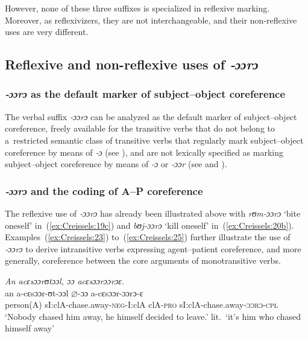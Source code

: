 \documentclass[output=paper]{langscibook}
\begin{document}
  \z
\z

However, none of these three suffixes is specialized in reflexive marking.
Moreover, as reflexivizers, they are not interchangeable, and their
non-reflexive uses are very different.

\subsection{Reflexive and non-reflexive uses of \textit{‑ɔɔrɔ}}%
\label{sec:Creissels:ooro}

\subsubsection{\textit{‑ɔɔrɔ} as the default marker of subject--object coreference}%
\label{sec:Creissels:ooro-default}

The verbal suffix \textit{‑ɔɔrɔ} can be analyzed as the default marker of
subject--object coreference, freely available for the transitive verbs that do
not belong to a~restricted semantic class of transitive verbs that regularly
mark subject--object coreference by means of \textit{‑ɔ} (see
), and are not lexically specified as marking
subject--object coreference by means of \textit{‑ɔ} or \textit{‑ɔɔr} (see
 and ).

\subsubsection{\textit{‑ɔɔrɔ} and the coding of A--P coreference}%
\label{sec:Creissels:ooro-ap}

The reflexive use of \textit{‑ɔɔrɔ} has already been illustrated above with
\textit{rʊm-ɔɔrɔ} `bite oneself' in~(\ref{ex:Creissels:19c}) and \textit{bʊj-ɔɔrɔ} `kill
oneself' in~(\ref{ex:Creissels:20b}).  Examples~(\ref{ex:Creissels:23})
to~(\ref{ex:Creissels:25}) further illustrate the use of \textit{‑ɔɔrɔ} to derive
intransitive verbs expressing agent--patient coreference, and more generally,
coreference between the core arguments of monotransitive verbs.

\ea
  \label{ex:Creissels:23}
  
    \textit{An acɛsɔɔrʊtɔɔl, ɔɔ acɛsɔɔrɔɔrɔɛ.}\\
    \gll an a-cɛsɔɔr-ʊt-ɔɔl $\varnothing$-ɔɔ a-cɛsɔɔr-ɔɔrɔ-ɛ\\
    person(A) sI:clA-chase.away-\textsc{neg}-I:clA clA-\textsc{pro} sI:clA-chase.away-\textsc{ɔɔrɔ-cpl}\\
    \glt `Nobody chased him away, he himself decided to leave.'
    lit.\ `it's him who chased himself away'
\z
\end{document}
